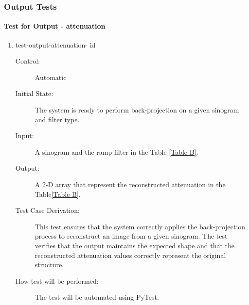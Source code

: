 \documentclass[12pt, titlepage]{article}
\newcounter{testnum}
\newcommand{\dthetestnum}{id\thetestnum}
\begin{document}
\subsubsection{Output Tests}\label{output_test}
\paragraph{Test for Output - attenuation}
\begin{enumerate}
\item{test-output-attenuation- \label{id5} \dthetestnum}
\begin{description}
\item[Control:] Automatic

\item[Initial State:] The system is ready to perform back-projection on a given
  sinogram and filter type.

\item[Input:] A sinogram and the ramp filter in the Table \ref{Table B}.

\item[Output:] A 2-D array that represent the reconstructed attenuation in the
  Table\ref{Table B}.

\item[Test Case Derivation:] This test ensures that the system correctly applies the back-projection process to reconstruct an image from a given sinogram. The test verifies that the output maintains the expected shape and that the reconstructed attenuation values correctly represent the original structure.

\item[How test will be performed:] The test will be automated using PyTest.
\end{description}
\end{enumerate}
\end{document}
